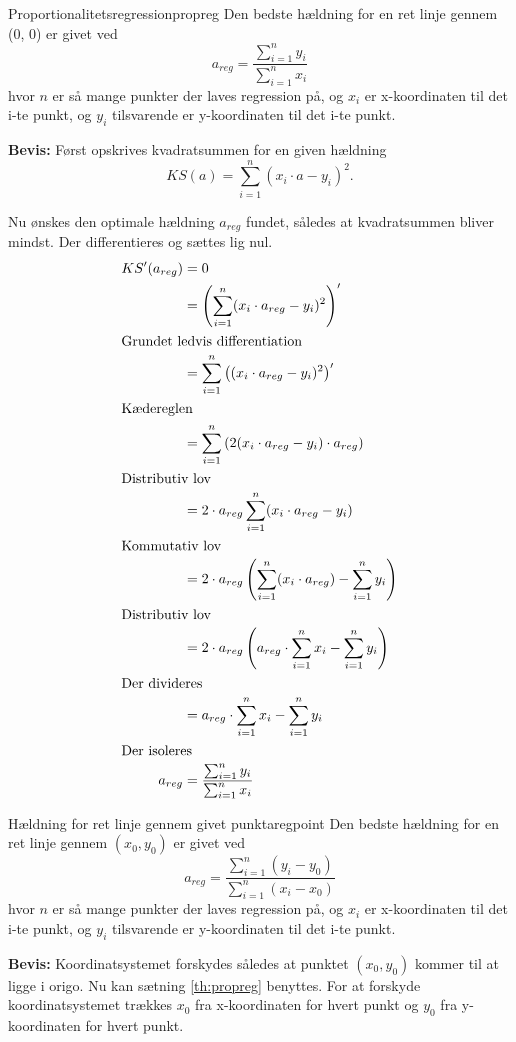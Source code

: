 \documentclass{article}
\begin{document}
\begin{theorem}{Proportionalitetsregression}{propreg}
	Den bedste hældning for en ret linje gennem (0, 0) er givet ved
	\[
		a_{reg} = \frac{\sum_{i=1}^n y_i}{\sum_{i=1}^n x_i}
	\] 
	hvor $n$ er så mange punkter der laves regression på, og $x_i$ er x-koordinaten
	til det i-te punkt, og $y_i$ tilsvarende er y-koordinaten til det i-te punkt.
\end{theorem}

\textbf{Bevis:}
Først opskrives kvadratsummen for en given hældning
\[
	KS(a) = \sum_{i=1}^n (x_i \cdot a - y_i)^2.
\] 

Nu ønskes den optimale hældning $a_{reg}$ fundet, således at kvadratsummen bliver
mindst. Der differentieres og sættes lig nul.
\begin{align*}
	KS'(a_{reg}) &= 0\\
				 &= \left(\sum_{i=1}^n (x_i \cdot a_{reg} - y_i)^2\right)'\\
\intertext{Grundet ledvis differentiation}
				 &= \sum_{i=1}^n \left((x_i \cdot a_{reg} - y_i)^2\right)'\\
				 \intertext{Kædereglen}
				 &= \sum_{i=1}^n \left(2(x_i \cdot a_{reg} - y_i) \cdot a_{reg}\right)\\
				 \intertext{Distributiv lov}
				 &= 2 \cdot a_{reg} \sum_{i=1}^n (x_i \cdot a_{reg} - y_i)\\
				 \intertext{Kommutativ lov}
				 &= 2 \cdot a_{reg} \left(\sum_{i=1}^n (x_i \cdot a_{reg}) - \sum_{i=1}^n y_i\right)\\
				 \intertext{Distributiv lov}
				 &= 2 \cdot a_{reg} \left(a_{reg} \cdot \sum_{i=1}^n x_i - \sum_{i=1}^n y_i\right)\\
				 \intertext{Der divideres}
				 &= a_{reg} \cdot \sum_{i=1}^n x_i - \sum_{i=1}^n y_i\\
				 \intertext{Der isoleres}
		 a_{reg} &= \frac{\sum_{i=1}^n y_i}{\sum_{i=1}^n x_i}
\end{align*}

\begin{theorem}{Hældning for ret linje gennem givet punkt}{aregpoint}
	Den bedste hældning for en ret linje gennem $(x_0, y_0)$ er givet ved
	\[
		a_{reg} = \frac{\sum_{i=1}^n (y_i-y_0)}{\sum_{i=1}^n (x_i-x_0)}
	\] 
	hvor $n$ er så mange punkter der laves regression på, og $x_i$ er x-koordinaten
	til det i-te punkt, og $y_i$ tilsvarende er y-koordinaten til det i-te punkt.
\end{theorem}

\textbf{Bevis:}
Koordinatsystemet forskydes således at punktet $(x_0, y_0)$ kommer til at ligge
i origo. Nu kan sætning \ref{th:propreg} benyttes. For at forskyde
koordinatsystemet trækkes $x_0$ fra x-koordinaten for hvert punkt og $y_0$ fra
y-koordinaten for hvert punkt.
\end{document}
